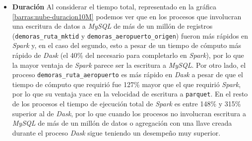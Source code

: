 \begin{itemize}
	\item \textbf{Duración} Al considerar el tiempo total, representado en la gráfica \ref{barras:nube-duracion10M} podemos ver que en los procesos que involucran una escritura de datos a \textit{MySQL} de más de un millón de registros (\texttt{demoras\_ruta\_mktid} y \texttt{demoras\_aeropuerto\_origen}) fueron más rápidos en \textit{Spark} y, en el caso del segundo, esto a pesar de un tiempo de cómputo más rápido de \textit{Dask} (el 40\% del necesario para completarlo en \textit{Spark}), por lo que la mayor ventaja de \textit{Spark} parece ser la escritura a \textit{MySQL}. Por otro lado, el proceso \texttt{demoras\_ruta\_aeropuerto} es más rápido en \textit{Dask} a pesar de que el tiempo de cómputo que requirió fue 127\% mayor que el que requirió \textit{Spark}, por lo que su ventaja yace en la velocidad de escritura a \texttt{parquet}. En el resto de los procesos el tiempo de ejecución total de \textit{Spark} es entre 148\% y 315\% superior al de \textit{Dask}, por lo que cuando los procesos no involucran escritura a \textit{MySQL} de más de un millón de datos o agregación con una llave creada durante el proceso \textit{Dask} sigue teniendo un desempeño muy superior.
	
\end{itemize}

